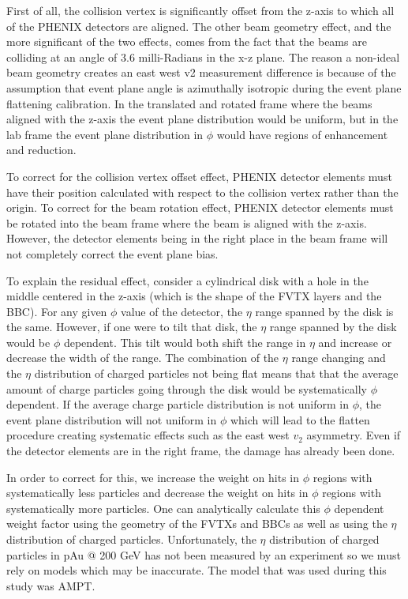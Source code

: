 First of all, the collision vertex is significantly offset from the z-axis to which all of the PHENIX detectors are aligned. The other beam geometry effect, and the more significant of the two effects, comes from the fact that the beams are colliding at an angle of 3.6 milli-Radians in the x-z plane. The reason a non-ideal beam geometry creates an east west v2 measurement difference is because of the assumption that event plane angle is azimuthally isotropic during the event plane flattening calibration. In the translated and rotated frame where the beams aligned with the z-axis the event plane distribution would be uniform, but in the lab frame the event plane distribution in $\phi$ would have regions of enhancement and reduction.

To correct for the collision vertex offset effect, PHENIX detector elements must have their position calculated with respect to the collision vertex rather than the origin. To correct for the beam rotation effect, PHENIX detector elements must be rotated into the beam frame where the beam is aligned with the z-axis. However, the detector elements being in the right place in the beam frame will not completely correct the event plane bias. 

To explain the residual effect, consider a cylindrical disk with a hole in the middle centered in the z-axis (which is the shape of the FVTX layers and the BBC). For any given $\phi$ value of the detector, the $\eta$ range spanned by the disk is the same. However, if one were to tilt that disk, the $\eta$ range spanned by the disk would be $\phi$ dependent. This tilt would both shift the range in $\eta$ and increase or decrease the width of the range. The combination of the $\eta$ range changing and the $\eta$ distribution of charged particles not being flat means that that the average amount of charge particles going through the disk would be systematically $\phi$ dependent. If the average charge particle distribution is not uniform in $\phi$, the event plane distribution will not uniform in $\phi$ which will lead to the flatten procedure creating systematic effects such as the east west $v_2$ asymmetry. Even if the detector elements are in the right frame, the damage has already been done.

In order to correct for this, we increase the weight on hits in $\phi$ regions with systematically less particles and decrease the weight on hits in $\phi$ regions with systematically more particles. One can analytically calculate this $\phi$ dependent weight factor using the geometry of the FVTXs and BBCs as well as using the $\eta$ distribution of charged particles. Unfortunately, the $\eta$ distribution of charged particles in pAu @ 200 GeV has not been measured by an experiment so we must rely on models which may be inaccurate. The model that was used during this study was AMPT.

